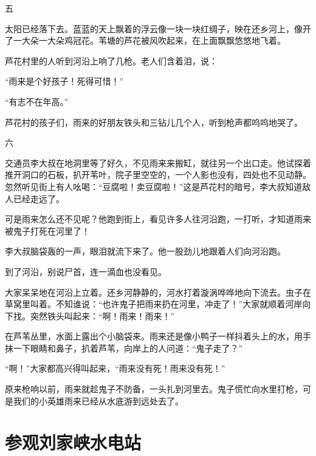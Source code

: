 \documentclass[12pt,UTF-8,openany]{ctexbook}
\begin{document}
\begin{large}
    五
    
    太阳已经落下去。蓝蓝的天上飘着的浮云像一块一块红绸子，映在还乡河上，像开了一大朵一大朵鸡冠花。苇塘的芦花被风吹起来，在上面飘飘悠悠地飞着。
    
    芦花村里的人听到河沿上响了几枪。老人们含着泪，说：
    
    “雨来是个好孩子！死得可惜！”
    
    “有志不在年高。”
    
    芦花村的孩子们，雨来的好朋友铁头和三钻儿几个人，听到枪声都呜呜地哭了。
    
    六
    
    交通员李大叔在地洞里等了好久，不见雨来来搬缸，就往另一个出口走。他试探着推开洞口的石板，扒开苇叶，院子里空空的，一个人影也没有，四处也不见动静。忽然听见街上有人吆喝：“豆腐啦！卖豆腐啦！”这是芦花村的暗号，李大叔知道敌人已经走远了。
    
    可是雨来怎么还不见呢？他跑到街上，看见许多人往河沿跑，一打听，才知道雨来被鬼子打死在河里了！
    
    李大叔脑袋轰的一声，眼泪就流下来了。他一股劲儿地跟着人们向河沿跑。
    
    到了河沿，别说尸首，连一滴血也没看见。
    
    大家呆呆地在河沿上立着。还乡河静静的，河水打着漩涡哗哗地向下流去。虫子在草窝里叫着。不知谁说：“也许鬼子把雨来扔在河里，冲走了！”大家就顺着河岸向下找。突然铁头叫起来：“啊！雨来！雨来！”
    
    在芦苇丛里，水面上露出个小脑袋来。雨来还是像小鸭子一样抖着头上的水，用手抹一下眼睛和鼻子，扒着芦苇，向岸上的人问道：“鬼子走了？”
    
    “啊！”大家都高兴得叫起来，“雨来没有死！雨来没有死！”
    
    原来枪响以前，雨来就趁鬼子不防备，一头扎到河里去。鬼子慌忙向水里打枪，可是我们的小英雄雨来已经从水底游到远处去了。
    
\end{large}



\chapter{参观刘家峡水电站}
\end{document}
